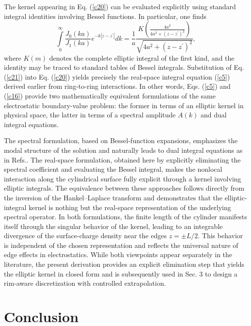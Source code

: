 \documentclass[12pt]{article}
\begin{document}
The kernel appearing in Eq. (\ref{c20}) can be evaluated explicitly using
standard integral identities involving Bessel functions. In particular, one
finds%
\begin{equation}
\int\limits_{0}^{\infty}\frac{J_{0}(ka)}{J_{1}(ka)}e^{-k\left|  z-z^{\prime
}\right|  }dk=\frac{1}{a}\frac{K\left(  \frac{4a^{2}}{4a^{2}+\left(
z-z^{\prime}\right)  ^{2}}\right)  }{\sqrt{4a^{2}+\left(  z-z^{\prime}\right)
^{2}}}, \label{c21}%
\end{equation}
where $K(m)$ denotes the complete elliptic integral of the first kind, and the
identity may be traced to standard tables of Bessel integrals\cite{tab}.
Substitution of Eq. (\ref{c21}) into Eq. (\ref{c20}) yields precisely the
real-space integral equation (\ref{c5}) derived earlier from ring-to-ring
interactions. In other words, Eqs. (\ref{c5}) and (\ref{c16}) provide two
mathematically equivalent formulations of the same electrostatic
boundary-value problem: the former in terms of an elliptic kernel in physical
space, the latter in terms of a spectral amplitude $A(k)$ and dual integral equations.

The spectral formulation, based on Bessel-function expansions, emphasizes the
modal structure of the solution and naturally leads to dual integral equations
as in Refs.\cite{c2a,c2b,c2c,c3,c4}. The real-space formulation, obtained here
by explicitly eliminating the spectral coefficient and evaluating the Bessel
integral, makes the nonlocal interaction along the cylindrical surface fully
explicit through a kernel involving elliptic integrals. The equivalence
between these approaches follows directly from the inversion of the
Hankel--Laplace transform and demonstrates that the elliptic-integral kernel
is nothing but the real-space representation of the underlying spectral
operator. In both formulations, the finite length of the cylinder manifests
itself through the singular behavior of the kernel, leading to an integrable
divergence of the surface-charge density near the edges $z=\pm L/2$. This
behavior is independent of the chosen representation and reflects the
universal nature of edge effects in electrostatics. While both viewpoints
appear separately in the literature, the present derivation provides an
explicit elimination step that yields the elliptic kernel in closed form and
is subsequently used in Sec. 3 to design a rim-aware discretization with
controlled extrapolation.

\section{Conclusion}
\end{document}

